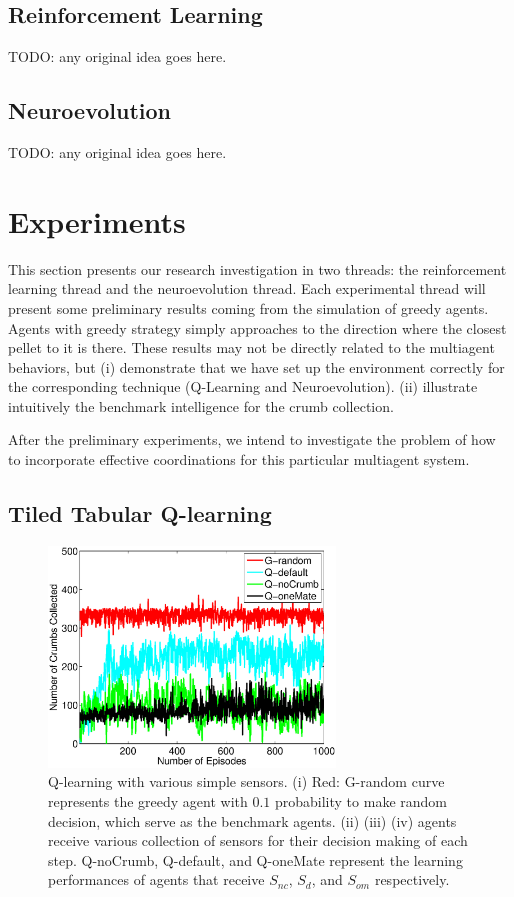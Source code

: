\documentclass[conference]{IEEEtran}
\begin{document}
\subsection{Reinforcement Learning} 
TODO: any original idea goes here.

\subsection{Neuroevolution} 
TODO: any original idea goes here.


\section{Experiments} \label{section:setup}
This section presents our research investigation in two threads: the
reinforcement learning thread and the neuroevolution thread.
Each experimental thread will present some preliminary results coming from the
simulation of greedy agents. Agents with greedy strategy simply approaches to
the direction
where the closest pellet to it is there.  These results may not be directly
related to the multiagent behaviors, but 
(i) demonstrate that we have set up the environment correctly for the
corresponding technique (Q-Learning and Neuroevolution). 
(ii) illustrate intuitively the benchmark intelligence for the crumb
collection.

After the preliminary experiments, we intend to investigate the problem of how
to incorporate effective coordinations for this particular multiagent system.

\subsection{Tiled Tabular Q-learning}

\begin{figure}[!t]
\centering
\includegraphics[width=3.0in]{./figures/RL/init_setup1.eps}
\caption{Q-learning with various simple sensors. (i) Red: G-random curve
    represents the greedy agent with $0.1$ probability to make random
    decision, which serve as the benchmark agents. 
    (ii) (iii) (iv) agents receive various collection of sensors for their
    decision making of each step. Q-noCrumb, Q-default, and Q-oneMate
    represent the learning performances of agents that receive $S_{nc}$,
    $S_{d}$, and $S_{om}$ respectively.
} 
\label{fig:RL_init}
\end{figure}
\end{document}
